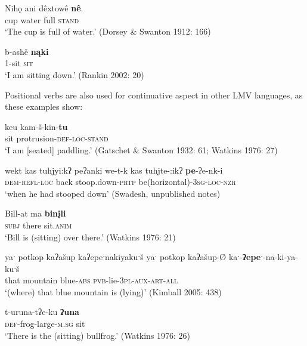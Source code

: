 \documentclass[output=paper]{LSP/langsci}
\begin{document}
\ea
\settowidth{}
\gll	Nihǫ 	ani 	dêxtowê \textbf{nê}.\\
		cup water full  \textsc{stand}\\ 
\glt	`The cup is full of water.' (Dorsey \& Swanton 1912: 166)
\z
		
\ea
\settowidth{}
\gll	b-ashě \textbf{nąki}\\
		1-sit \textsc{sit}\\ 
\glt	`I am sitting down.' (Rankin 2002: 20)
\z

Positional verbs are also used for continuative aspect in other LMV languages, as these examples show:

\ea
\settowidth{}
\gll	keu kam-š-kin-\textbf{tu}\\
		sit protrusion-\textsc{def-loc-stand}\\ 
\glt `I am [seated] paddling.' (Gatschet \& Swanton 1932: 61; Watkins 1976: 27)
\z

\ea	
\settowidth{}
wekt kas tuhjyi:kʔ peʔanki 
\gll		we-t-k 	 kas 	 tuhjte-:ikʔ 	 \textbf{pe}-ʔe-nk-i\\
		\textsc{dem-refl-loc} back	  stoop.down-\textsc{prtp} be(horizontal)-\textsc{3sg-loc-nzr}\\
\glt	`when he had stooped down' (Swadesh, unpublished notes)
\z

\ea
\settowidth{}
\gll	Bill-at ma \textbf{binįli}\\
	 \textsc{subj} there sit.\textsc{anim}\\ 
\glt `Bill is (sitting) over there.' (Watkins 1976: 21)
\z
		
\ea	
\settowidth{} 
yaˑ potkop kaʔašup kaʔepeˑnakiyakuˑš\footnotemark {}
\gll		yaˑ potkop kaʔašup-Ø kaˑ-\textbf{ʔepeˑ}-na-ki-ya-kuˑš\\
		that mountain blue-\textsc{abs} \textsc{pvb}-lie-\textsc{3pl-aux-art-all}\\
\glt	`(where) that blue mountain is (lying)' (Kimball 2005: 438)
\z

\ea
\settowidth{}
\gll	t-uruna-tʔe-ku 	\textbf{ʔuna}\\
 \textsc{def}-frog-large-\textsc{m.sg} sit\\ 
\glt `There is the (sitting) bullfrog.' (Watkins 1976: 26)
\z
\end{document}
